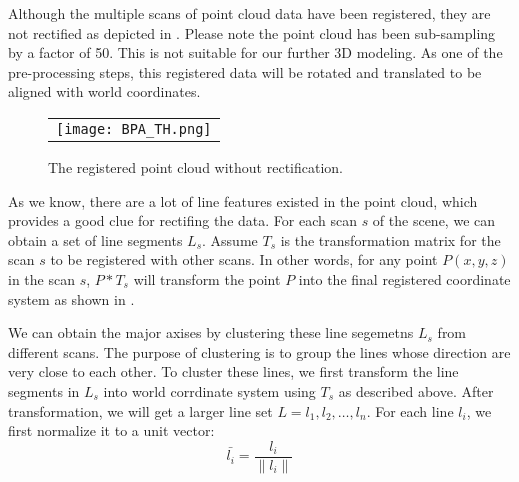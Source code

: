 Although the multiple scans of point cloud data have been registered, 
they are not rectified as depicted in . 
Please note the point cloud has been sub-sampling by a factor of 50.
This is not suitable for our further 3D modeling.
As one of the pre-processing steps, this registered data will be rotated
and translated to be aligned with world coordinates.

\begin{figure}[htbp]
\begin{center}
\begin{tabular}{c}
\texttt{[image: BPA\_TH.png]}
\end{tabular}
\end{center}
\caption{ The registered point cloud without rectification. }
\label{fig:pc_orig}
\end{figure}

As we know, there are a lot of line features existed in the point cloud, which
provides a good clue for rectifing the data. 
For each scan $s$ of the scene, we can obtain a set of line segments $L_s$. 
Assume $T_s$ is the transformation matrix for the scan $s$ to be registered with other scans.
In other words, for any point $P(x,y,z)$ in the scan $s$, $P*T_s$ will transform the
point $P$ into the final registered coordinate system as shown in .

We can obtain the major axises by clustering these line segemetns $L_s$ from different
scans. The purpose of clustering is to group the lines whose direction are very close to each other.
To cluster these lines, we first transform the line segments in $L_s$ into world
corrdinate system using $T_s$ as described above. After transformation, we will
get a larger line set $L = {l_1, l_2, \ldots, l_n}$. For each line $l_i$, we first
normalize it to a unit vector:
\begin{equation*}
\bar{l_i} = \frac{l_i}{\parallel l_i \parallel}
\end{equation*}

